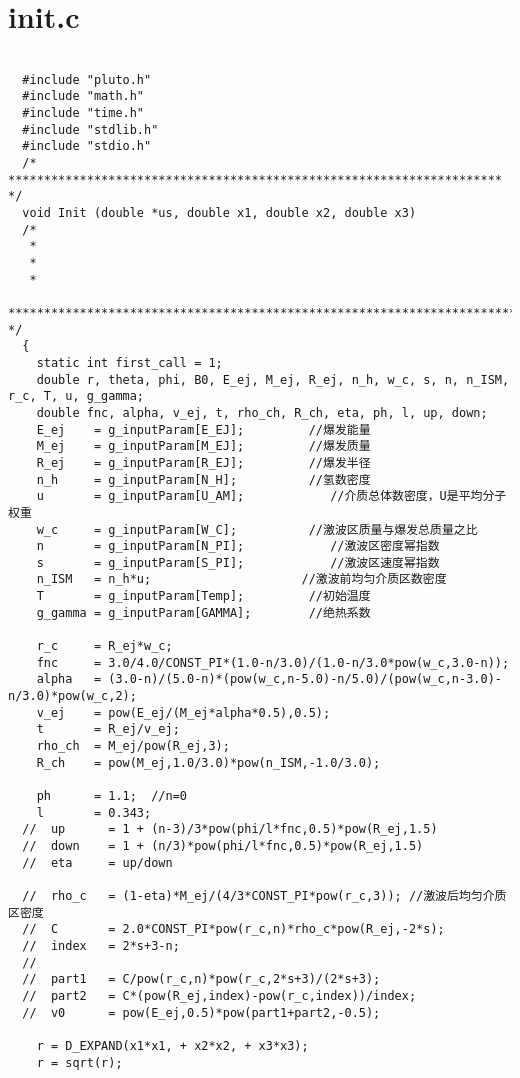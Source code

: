 \section{init.c}
\label{init}
\begin{lstlisting}

  #include "pluto.h"
  #include "math.h"
  #include "time.h"
  #include "stdlib.h"
  #include "stdio.h"
  /* ********************************************************************* */
  void Init (double *us, double x1, double x2, double x3)
  /*
   *
   *
   *
   *********************************************************************** */
  {
    static int first_call = 1;
    double r, theta, phi, B0, E_ej, M_ej, R_ej, n_h, w_c, s, n, n_ISM, r_c, T, u, g_gamma;
    double fnc, alpha, v_ej, t, rho_ch, R_ch, eta, ph, l, up, down;
    E_ej    = g_inputParam[E_EJ];         //爆发能量
    M_ej    = g_inputParam[M_EJ];         //爆发质量
    R_ej    = g_inputParam[R_EJ];         //爆发半径
    n_h     = g_inputParam[N_H];          //氢数密度
    u       = g_inputParam[U_AM];            //介质总体数密度，U是平均分子权重
    w_c     = g_inputParam[W_C];          //激波区质量与爆发总质量之比
    n       = g_inputParam[N_PI];            //激波区密度幂指数
    s       = g_inputParam[S_PI];            //激波区速度幂指数
    n_ISM   = n_h*u;                     //激波前均匀介质区数密度
    T       = g_inputParam[Temp];         //初始温度
    g_gamma = g_inputParam[GAMMA];        //绝热系数

    r_c     = R_ej*w_c;
    fnc     = 3.0/4.0/CONST_PI*(1.0-n/3.0)/(1.0-n/3.0*pow(w_c,3.0-n));
    alpha   = (3.0-n)/(5.0-n)*(pow(w_c,n-5.0)-n/5.0)/(pow(w_c,n-3.0)-n/3.0)*pow(w_c,2);
    v_ej    = pow(E_ej/(M_ej*alpha*0.5),0.5);
    t       = R_ej/v_ej;
    rho_ch  = M_ej/pow(R_ej,3);
    R_ch    = pow(M_ej,1.0/3.0)*pow(n_ISM,-1.0/3.0);

    ph      = 1.1;  //n=0
    l       = 0.343;
  //  up      = 1 + (n-3)/3*pow(phi/l*fnc,0.5)*pow(R_ej,1.5)
  //  down    = 1 + (n/3)*pow(phi/l*fnc,0.5)*pow(R_ej,1.5)
  //  eta     = up/down

  //  rho_c   = (1-eta)*M_ej/(4/3*CONST_PI*pow(r_c,3)); //激波后均匀介质区密度
  //  C       = 2.0*CONST_PI*pow(r_c,n)*rho_c*pow(R_ej,-2*s);
  //  index   = 2*s+3-n;
  //
  //  part1   = C/pow(r_c,n)*pow(r_c,2*s+3)/(2*s+3);
  //  part2   = C*(pow(R_ej,index)-pow(r_c,index))/index;
  //  v0      = pow(E_ej,0.5)*pow(part1+part2,-0.5);

    r = D_EXPAND(x1*x1, + x2*x2, + x3*x3);
    r = sqrt(r);


\end{lstlisting}
